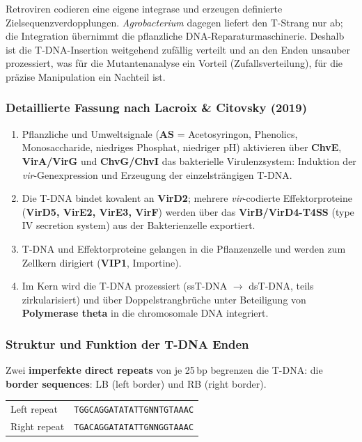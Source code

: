 \begin{bem}
    Retroviren codieren
    eine eigene \gls{integrase} und erzeugen definierte
    Zielsequenzverdopplungen. \emph{Agrobacterium} dagegen liefert den T-Strang nur
    ab; die Integration übernimmt die pflanzliche
    DNA-Reparaturmaschinerie.
    Deshalb ist die T-DNA-Insertion
    weitgehend zufällig verteilt und an den Enden unsauber
    prozessiert, was für die Mutantenanalyse ein Vorteil (Zufallsverteilung),
    für die präzise Manipulation ein Nachteil ist.
\end{bem}

\subsubsection*{Detaillierte Fassung nach Lacroix \& Citovsky (2019)}
\begin{enumerate}
    \item Pflanzliche und Umweltsignale (\textbf{AS} = Acetosyringon, Phenolics,
    Monosaccharide, niedriges Phosphat, niedriger pH) aktivieren über
    \textbf{ChvE}, \textbf{VirA/VirG} und \textbf{ChvG/ChvI} das bakterielle
    Virulenzsystem: Induktion der \emph{vir}-Genexpression und Erzeugung der
    einzelsträngigen T-DNA.
    \item Die T-DNA bindet kovalent an \textbf{VirD2}; mehrere
    \emph{vir}-codierte Effektorproteine (\textbf{VirD5, VirE2, VirE3,
        VirF}) werden über das \textbf{VirB/VirD4-T4SS} (type IV secretion
    system) aus der Bakterienzelle exportiert.
    \item T-DNA und Effektorproteine gelangen in die Pflanzenzelle und werden
    zum Zellkern dirigiert (\textbf{VIP1}, Importine).
    \item Im Kern wird die T-DNA prozessiert (ssT-DNA $\to$ dsT-DNA, teils
    zirkularisiert) und über Doppelstrangbrüche unter Beteiligung von
    \textbf{Polymerase theta} in die chromosomale DNA integriert.
\end{enumerate}

\subsubsection{Struktur und Funktion der T-DNA Enden}
Zwei \textbf{imperfekte direct repeats} von je 25\,bp begrenzen die T-DNA:
die \textbf{border sequences}: LB (left border) und RB (right border).

\begin{mytable}\small
\begin{tabular}{@{}ll@{}}
    \hline
    Left repeat  & \texttt{TGGCAGGATATATTGNNTGTAAAC} \\
    Right repeat & \texttt{TGACAGGATATATTGNNGGTAAAC} \\
    \hline
\end{tabular}
\end{mytable}


